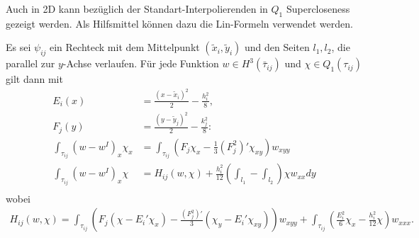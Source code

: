 Auch in 2D kann bezüglich der Standart-Interpolierenden in $Q_{1}$ Supercloseness gezeigt werden. Als Hilfsmittel können dazu die Lin-Formeln verwendet werden.
\begin{lemma}\label{lem:7-15}
  Es sei $\psi_{ij}$ ein Rechteck mit dem Mittelpunkt $(\tilde x_{i}, \tilde y_{i})$ und den Seiten $l_{1}, l_{2}$, die parallel zur $y$-Achse verlaufen. Für jede Funktion $w \in H^{3}(\bar \tau_{ij})$ und $\chi \in Q_{1}(\tau_{ij})$ gilt dann mit
  \begin{align*}
    E_{i}(x) &= \frac{(x - \tilde x_{i})^{2}} 2 - \frac{h_{i}^{2}}8, \\
    F_{j}(y) &= \frac{(y - \tilde y_{j})^{2}} 2 - \frac{k_{j}^{2}}8:\\
    \int_{\tau_{ij}} (w - w^{I})_{x} \chi_{x} &= \int_{\tau_{ij}} (F_{j} \chi_{x} - \frac 13 (F_{j}^{2})' \chi_{xy})w_{xyy}\\
    \int_{\tau_{ij}} (w - w^{I})_{x} \chi &= H_{ij}(w, \chi) + \frac{h_{i}^{2}}{12}(\int_{l_{1}} - \int_{l_{2}}) \chi w_{xx} dy\\
  \end{align*}
wobei
\begin{align*}
  H_{ij}(w, \chi) = \int_{\tau_{ij}} (F_{j}(\chi - E_{i}' \chi_{x}) - \frac{(F_{j}^{2})'}3(\chi_{y} - E_{i}' \chi_{xy})) w_{xyy} + \int_{\tau_{ij}}(\frac{E_{i}^{2}} 6 \chi_{x} - \frac{h_{i}^{2}}{12} \chi)w_{xxx}. 
\end{align*}
\end{lemma}
